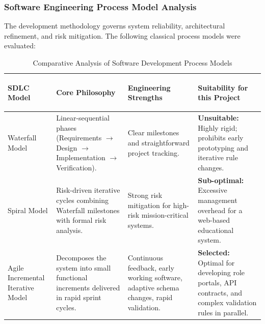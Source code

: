 \documentclass[a4paper,12pt]{article}
\begin{document}
\subsubsection{Software Engineering Process Model Analysis}
The development methodology governs system reliability, architectural refinement, and risk mitigation. The following classical process models were evaluated:

\begin{table}[H]
\centering
\small
\renewcommand{\arraystretch}{1.3}
\begin{tabularx}{\textwidth}{>{\bfseries\raggedright\arraybackslash}p{2.6cm} >{\raggedright\arraybackslash}p{4.0cm} >{\raggedright\arraybackslash}p{4.0cm} >{\raggedright\arraybackslash}X}
\toprule
\textbf{SDLC Model} & \textbf{Core Philosophy} & \textbf{Engineering Strengths} & \textbf{Suitability for this Project} \\
\midrule
Waterfall Model & Linear-sequential phases (Requirements $\to$ Design $\to$ Implementation $\to$ Verification). & Clear milestones and straightforward project tracking. & \textbf{Unsuitable:} Highly rigid; prohibits early prototyping and iterative rule changes. \\
\addlinespace
Spiral Model & Risk-driven iterative cycles combining Waterfall milestones with formal risk analysis. & Strong risk mitigation for high-risk mission-critical systems. & \textbf{Sub-optimal:} Excessive management overhead for a web-based educational system. \\
\addlinespace
Agile Incremental Iterative Model & Decomposes the system into small functional increments delivered in rapid sprint cycles. & Continuous feedback, early working software, adaptive schema changes, rapid validation. & \textbf{Selected:} Optimal for developing role portals, API contracts, and complex validation rules in parallel. \\
\bottomrule
\end{tabularx}
\caption{Comparative Analysis of Software Development Process Models}
\end{table}
\end{document}
